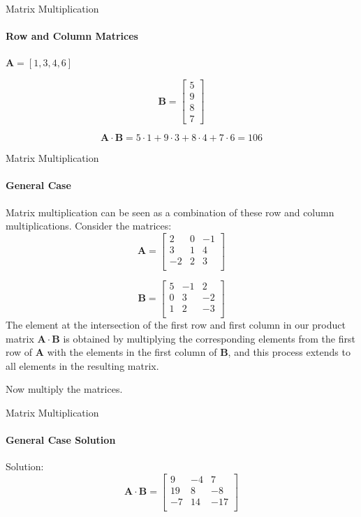 \documentclass{beamer}
\begin{document}
\begin{frame}{Matrix Multiplication}
\framesubtitle{Row and Column Matrices}
\begin{center}
    \(\mathbf{A} = [1, 3, 4, 6]\) 
\end{center}

\[
\mathbf{B} =
\begin{bmatrix}
    5 \\
    9 \\
    8 \\
    7
\end{bmatrix}
\]

\[
\mathbf{A} \cdot \mathbf{B} = 5 \cdot 1 + 9 \cdot 3 + 8 \cdot 4 + 7 \cdot 6 = 106
\]   
\end{frame}

\begin{frame}{Matrix Multiplication}
\framesubtitle{General Case}
Matrix multiplication can be seen as a combination of these row and column multiplications.
Consider the matrices:
\[
\mathbf{A} =
\begin{bmatrix}
    2 & 0 & -1 \\
    3 & 1 & 4 \\
    -2 & 2 & 3 \\
\end{bmatrix}
\]

\[
\mathbf{B} =
\begin{bmatrix}
    5 & -1 & 2 \\
    0 & 3 & -2 \\
    1 & 2 & -3 \\
\end{bmatrix}
\]
The element at the intersection of the first row and first column in our product matrix $\mathbf{A} \cdot \mathbf{B}$ is obtained by multiplying the corresponding elements from the first row of $\mathbf{A}$ with the elements in the first column of $\mathbf{B}$, and this process extends to all elements in the resulting matrix.

Now multiply the matrices.
\end{frame}

\begin{frame}{Matrix Multiplication}
\framesubtitle{General Case Solution}
Solution: \[
\mathbf{A} \cdot \mathbf{B} =
\begin{bmatrix}
    9 & -4 & 7 \\
    19 & 8 & -8 \\
    -7 & 14 & -17 \\
\end{bmatrix}
\]
\end{frame}
\end{document}
